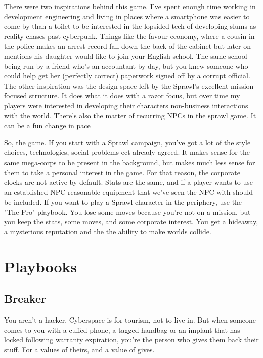 \documentclass{tufte-book}
\begin{document}
There were two inspirations behind this game. I've spent enough time working in development engineering and living in places where a smartphone was easier to come by than a toilet to be interested in the lopsided tech of developing slums as reality chases past cyberpunk. Things like the favour-economy, where a cousin in the police makes an arrest record fall down the back of the cabinet but later on mentions his daughter would like to join your English school.  The same school being run by a friend who's an accountant by day, but you knew someone who could help get her (perfectly correct) paperwork signed off by a corrupt official. The other inspiration was the design space left by the Sprawl's excellent mission focused structure. It does what it does with a razor focus, but over time my players were interested in developing their characters non-business interactions with the world. There's also the matter of recurring NPCs in the sprawl game. It can be a fun change in pace 

So, the game. If you start with a Sprawl campaign, you've got a lot of the style choices, technologies, social problems ect already agreed. It makes sense for the same mega-corps to be present in the background, but makes much less sense for them to take a personal interest in the game. For that reason, the corporate clocks are not active by default. Stats are the same, and if a player wants to use an established NPC reasonable equipment that we've seen the NPC with should be included. If you want to play a Sprawl character in the periphery, use the "The Pro" playbook. You lose some moves because you're not on a mission, but you keep the stats, some moves, and some corporate interest. You get a hideaway, a mysterious reputation and the the ability to make worlds collide.

\chapter{Playbooks} \label{ch:playbooks}

\section{Breaker} \label{sec: Breaker}

You aren't a hacker. Cyberspace is for tourism, not to live in. But when someone comes to you with a cuffed phone, a tagged handbag or an implant that has locked following warranty expiration, you're the person who gives them back their stuff. For a values of theirs, and a value of gives. 
\end{document}
